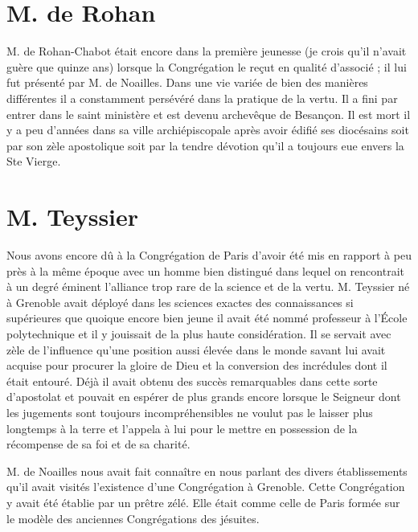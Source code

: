 \section*{M. de Rohan}
M. de Rohan-Chabot était encore dans la première jeunesse (je crois qu'il n'avait guère que quinze ans) lorsque la Congrégation le reçut en qualité d'associé ; il lui fut présenté par M. de Noailles. Dans une vie
variée de bien des manières différentes il a constamment persévéré dans la pratique de la vertu. Il a fini par entrer dans le saint ministère et est devenu archevêque de Besançon. Il est mort il y a peu d'années dans sa ville archiépiscopale après avoir édifié ses diocésains soit par son zèle apostolique soit par la tendre dévotion qu'il a toujours eue envers la Ste Vierge.

\section*{M. Teyssier}
Nous avons encore dû à la Congrégation de Paris d'avoir été mis en rapport à peu près à la même époque avec un homme bien distingué dans lequel on rencontrait à un degré éminent l'alliance trop rare de la science et de la vertu. M. Teyssier né à Grenoble avait déployé dans les sciences exactes des connaissances si supérieures que quoique encore bien jeune il avait été nommé professeur à l'École polytechnique et il y jouissait de la plus haute considération. Il se servait avec zèle de l'influence qu'une position aussi élevée dans le monde savant lui avait acquise pour procurer la gloire de Dieu et la conversion des incrédules dont il était entouré. Déjà il avait obtenu des succès remarquables dans cette sorte d'apostolat et pouvait en espérer de plus grands encore lorsque le Seigneur dont les jugements sont toujours incompréhensibles ne voulut pas le laisser plus longtemps à la terre et l'appela à lui pour le mettre en possession de la récompense de sa foi et de sa charité.

M. de Noailles nous avait fait connaître en nous parlant des divers établissements qu'il avait visités l'existence d'une Congrégation à Grenoble. Cette Congrégation y avait été établie par un prêtre zélé. Elle était comme celle de Paris formée sur le modèle des anciennes Congrégations des jésuites.

